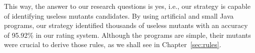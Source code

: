 
		
		
		



This way, the answer to our research questions is yes, i.e., our strategy is capable of identifying useless mutants candidates. 
By using artificial and small Java programs, our strategy identified thousands of useless mutants with an accuracy of 95.92\% in our rating system.
Although the programs are simple, their mutants were crucial to derive those rules, as we shall see in Chapter~\ref{sec:rules}.


